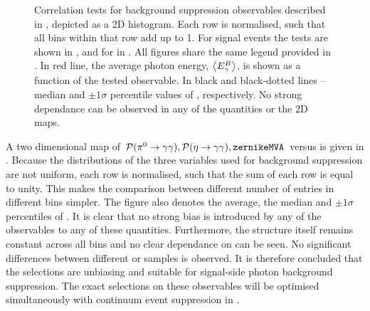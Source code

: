 \begin{figure}[htbp!]
{        }
    \caption{\label{fig:selection_correlations} Correlation tests for background suppression observables described in , depicted as a 2D histogram.
    Each row is normalised, such that all bins within that row add up to 1.
    For signal \MC \BptoXsgamma events the tests are shown
    in ,
    and for \BztoXsgamma in .
    All figures share the same legend provided in .
    In red line, the average photon energy, $\expval{{\ensuremath{E^B_{\gamma}}}}$, is shown as a function of the tested observable.
    In black and black-dotted lines -- median and $\pm 1 \sigma$ percentile values of \EB, respectively.
    No strong dependance can be observed in any of the quantities or the 2D maps.
    }
\end{figure}

A two dimensional map of ${{\mathcal{P}(\pi^0\rightarrow\gamma\gamma)},{\mathcal{P}(\eta\rightarrow\gamma\gamma)},{\texttt{zernikeMVA}}}$ versus \EB is given in .
Because the distributions of the three variables used for background suppression are not uniform, each row is normalised, such that the sum of each row is equal to unity.
This makes the comparison between different number of entries in different bins simpler.
The figure also denotes the average, the median and $\pm 1\sigma$ percentiles of \EB.
It is clear that no strong bias is introduced by any of the observables to any of these quantities.
Furthermore, the structure itself remains constant across all bins and no clear dependance on \EB can be seen.
No significant differences between different \Bp or \Bz samples is observed.
It is therefore concluded that the selections are unbiasing and suitable for signal-side photon background suppression.
The exact selections on these observables will be optimised simultaneously with continuum event suppression in .